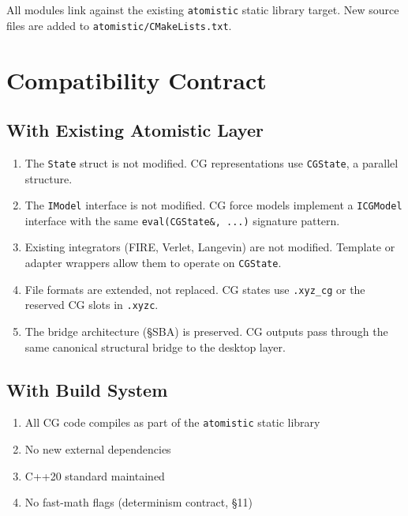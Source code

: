 \documentclass[11pt]{article}
\newcommand{\file}[1]{\texttt{#1}}
\newcommand{\type}[1]{\texttt{#1}}
\newcommand{\op}[1]{\texttt{#1}}
\begin{document}
All modules link against the existing \type{atomistic} static library
target.  New source files are added to \file{atomistic/CMakeLists.txt}.

\section{Compatibility Contract}

\subsection{With Existing Atomistic Layer}

\begin{enumerate}
  \item The \type{State} struct is not modified.  CG representations use
        \type{CGState}, a parallel structure.
  \item The \type{IModel} interface is not modified.  CG force models
        implement a \type{ICGModel} interface with the same
        \op{eval(CGState\&, ...)} signature pattern.
  \item Existing integrators (FIRE, Verlet, Langevin) are not modified.
        Template or adapter wrappers allow them to operate on \type{CGState}.
  \item File formats are extended, not replaced.  CG states use
        \texttt{.xyz\_cg} or the reserved CG slots in \texttt{.xyzc}.
  \item The bridge architecture (\S SBA) is preserved.  CG outputs pass
        through the same canonical structural bridge to the desktop layer.
\end{enumerate}

\subsection{With Build System}

\begin{enumerate}
  \item All CG code compiles as part of the \type{atomistic} static library
  \item No new external dependencies
  \item C++20 standard maintained
  \item No fast-math flags (determinism contract, \S11)
\end{enumerate}
\end{document}
